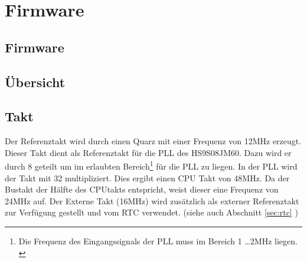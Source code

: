 \ifSTANDALONE
\section{Firmware}
\fi
\ifEMBED
\subsection{Firmware}
\fi

\subsection{Übersicht}

\subsection{Takt}
Der Referenztakt wird durch einen Quarz mit einer Frequenz von 
12\si{\mega\hertz} erzeugt.  Dieser Takt dient als Referenztakt für die PLL 
des HS9S08JM60. Dazu wird er durch 8 geteilt um im erlaubten 
Bereich\footnote{Die Frequenz des Eingangssignals der PLL muss im Bereich 1 
\ldots 2\si{\mega\hertz} liegen. \cite[p.  195]{Datasheet:HCS08}} für die PLL 
zu liegen. In der PLL wird der Takt mit 32 multipliziert. Dies ergibt einen 
CPU Takt von 48\si{\mega\hertz}. Da der Bustakt der Hälfte des CPUtakts 
entspricht, weist dieser eine Frequenz von 24\si{\mega\hertz} auf.  Der 
Externe Takt (16\si{\mega\hertz}) wird zusätzlich als externer Referenztakt 
zur Verfügung gestellt und vom RTC verwendet.  (siehe auch Abschnitt 
\ref{sec:rtc} )

